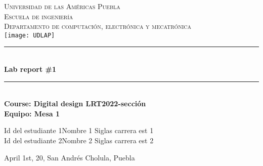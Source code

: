 \documentclass[12pt]{article}  %
\def\titulo{Lab report \#1}%
\def\materia{Course: Digital design LRT2022-sección} %
\def\fecha{April 1st, 20} %
\def\equipo {Mesa 1}%
\def\ida{Id del estudiante 1} %
\def\esta{Nombre 1}
\def\lica{Siglas carrera est 1}%
\def\idb{Id del estudiante 2}
\def\estb{Nombre 2}
\def\licb{Siglas carrera est 2}%
\begin{document}
\begin{center}														
\newcommand{\HRule}{\rule{\linewidth}{0.5mm}}						
\thispagestyle{empty} 												
\vspace*{-1.5cm}								
\textsc{\huge Universidad de las Américas Puebla}\\[1.5cm]	
\textsc{\LARGE Escuela de ingeniería}\\[1.5cm]	
\textsc{\LARGE Departamento de computación, electrónica y mecatrónica}\\[1.5cm]												
\texttt{[image: UDLAP]}  									\vspace*{1cm}														\HRule \\[0.4cm]												
{ \huge \bfseries \titulo}\\[0.4cm]	
\HRule \\[1cm]														
{ \Large \bfseries \materia}\\[1cm] 	
{ \Large \bfseries Equipo: \equipo}\\[1cm] 							
\begin{flushleft} \Large											
\ida \hspace{0.5cm}\esta \hspace{0.5cm} \lica\\
\idb \hspace{0.5cm}\estb \hspace{0.5cm} \licb\\
\end{flushleft}														
\vfill																
\begin{center}													
{\Large  \fecha, San Andrés Cholula, Puebla}						
\end{center}												 		
\end{center}							 								\newpage						
\setcounter{page}{1} %
\end{document}
